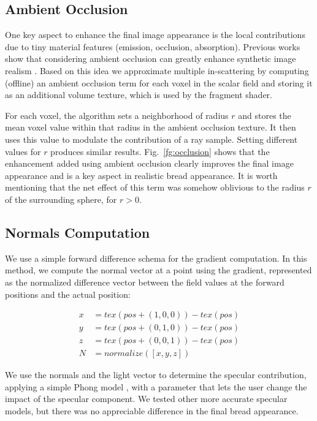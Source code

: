 \subsection{Ambient Occlusion}

One key aspect to enhance the final image appearance is the local contributions due to tiny material features (emission, occlusion, absorption). 
Previous works show that considering ambient occlusion can greatly enhance synthetic image realism \cite{Hernell2010}.
Based on this idea we approximate multiple in-scattering by computing (offline) an ambient occlusion term for each voxel in the scalar field and storing it as an additional volume texture, which is used by the fragment shader.

For each voxel, the algorithm sets a neighborhood of radius $r$ and stores the mean voxel value within that radius in the ambient occlusion texture.
It then uses this value to modulate the contribution of a ray sample.
Setting different values for $r$ produces similar results. 
Fig.~\ref{fg:occlusion} shows that the enhancement added using ambient occlusion clearly improves the final image appearance and is a key aspect in realistic bread appearance. It is worth mentioning that the net effect of this term was somehow oblivious to the radius $r$ of the surrounding sphere, for $r > 0$.
 
\subsection{Normals Computation}

We use a simple forward difference schema for the gradient computation. In this method, we compute the normal vector at a point using the gradient, represented as the normalized difference vector between the field values at the forward positions and the actual position:

\begin{equation}
\begin{aligned}
x &= tex(pos+(1,0,0)) - tex(pos)\\
y &= tex(pos+(0,1,0)) - tex(pos)\\
z &= tex(pos+(0,0,1)) - tex(pos) \\
N &= normalize([x,y,z])
\end{aligned}
\end{equation}

We use the normals and the light vector to determine the specular contribution, applying a simple Phong model \cite{Phong1973}, with a parameter that lets the user change the impact of the specular component.
We tested other more accurate specular models, but there was no appreciable difference in the final bread appearance.

